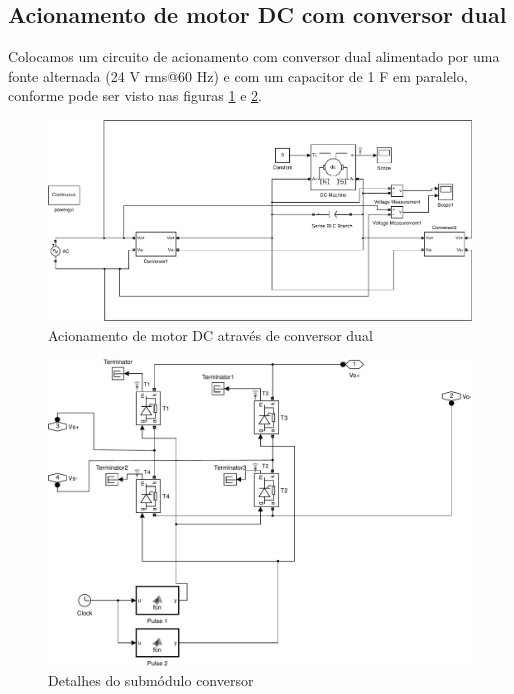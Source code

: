 \documentclass{article}
\begin{document}
\subsection{Acionamento de motor DC com conversor dual}
Colocamos um circuito de acionamento com conversor dual alimentado por uma fonte alternada (24 V rms@60 Hz) e com um capacitor de 1 F em paralelo, conforme pode ser visto nas figuras \ref{fig:sim5} e \ref{fig:sim6}.
\begin{figure}[H]
	\centering
	\includegraphics[width=\linewidth]{matlab/sim5}
	\caption{Acionamento de motor DC através de conversor dual}
	\label{fig:sim5}
\end{figure}
\begin{figure}[H]
	\centering
	\includegraphics[width=\linewidth]{matlab/sim6}
	\caption{Detalhes do submódulo conversor}
	\label{fig:sim6}
\end{figure}
\end{document}
